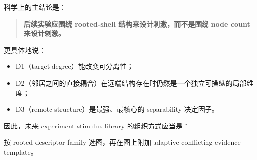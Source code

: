 \documentclass[11pt,a4paper]{ctexart}
\begin{document}
科学上的主结论是：
\begin{quote}
\textbf{后续实验应围绕 rooted-shell 结构来设计刺激，而不是围绕 node count 来设计刺激。}
\end{quote}

更具体地说：
\begin{itemize}
    \item D1（target degree）能改变可分离性；
    \item D2（邻居之间的直接耦合）在远端结构存在时仍然是一个独立可操纵的局部维度；
    \item D3（remote structure）是最强、最核心的 separability 决定因子。
\end{itemize}

因此，未来 experiment stimulus library 的组织方式应当是：
\begin{center}
按 rooted descriptor family 选图，再在图上附加 adaptive conflicting evidence template。
\end{center}
\end{document}
